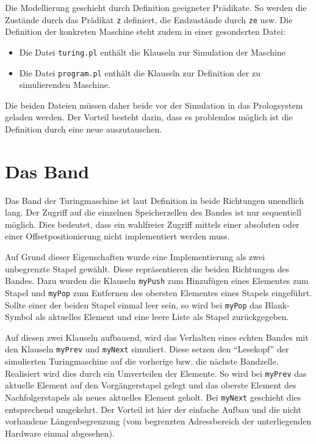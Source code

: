 \documentclass[final,a4paper,11pt,notitlepage,halfparskip]{scrreprt}
\begin{document}
Die Modellierung geschieht durch Definition geeigneter Prädikate. So
werden die Zustände durch das Prädikat \texttt{z} definiert, die
Endzustände durch \texttt{ze} usw. Die Definition der konkreten Maschine
steht zudem in einer gesonderten Datei: 
\begin{itemize}
    \item Die Datei \texttt{turing.pl} enthält die Klauseln zur
	Simulation der Maschine
    \item Die Datei \texttt{program.pl} enthält die Klauseln zur
	Definition der zu simulierenden Maschine.	
\end{itemize}
Die beiden Dateien müssen daher beide vor der Simulation in das
Prologsystem geladen werden. Der Vorteil besteht darin, dass es
problemlos möglich ist die Definition durch eine neue auszutauschen.

\section{Das Band}
Das Band der Turingmaschine ist laut Definition in beide Richtungen
unendlich lang. Der Zugriff auf die einzelnen Speicherzellen des Bandes
ist nur sequentiell möglich. Dies bedeutet, dass ein wahlfreier Zugriff
mittels einer absoluten oder einer Offsetpositionierung nicht
implementiert werden muss.

Auf Grund dieser Eigenschaften wurde eine Implementierung als zwei
unbegrenzte Stapel gewählt. Diese repräsentieren die beiden Richtungen
des Bandes. Dazu wurden die Klauseln \texttt{myPush} zum Hinzufügen
eines Elementes zum Stapel und \texttt{myPop} zum Entfernen des obersten
Elementes eines Stapels eingeführt. Sollte einer der beiden Stapel
einmal leer sein, so wird bei \texttt{myPop} das Blank-Symbol als 
aktuelles Element und eine leere Liste als Stapel zurückgegeben.

Auf diesen zwei Klauseln aufbauend, wird das Verhalten eines echten
Bandes mit den Klauseln \texttt{myPrev} und \texttt{myNext} simuliert.
Diese setzen den "`Lesekopf"' der simulierten Turingmaschine auf die
vorherige bzw. die nächste Bandzelle. Realisiert wird dies durch ein
Umverteilen der Elemente. So wird bei \texttt{myPrev} das aktuelle
Element auf den Vorgängerstapel gelegt und das oberste Element des
Nachfolgerstapels als neues aktuelles Element geholt. Bei
\texttt{myNext} geschieht dies entsprechend umgekehrt. Der Vorteil ist
hier der einfache Aufbau und die nicht vorhandene Längenbegrenzung (vom
begrenzten Adressbereich der unterliegenden Hardware einmal abgesehen).
\end{document}
